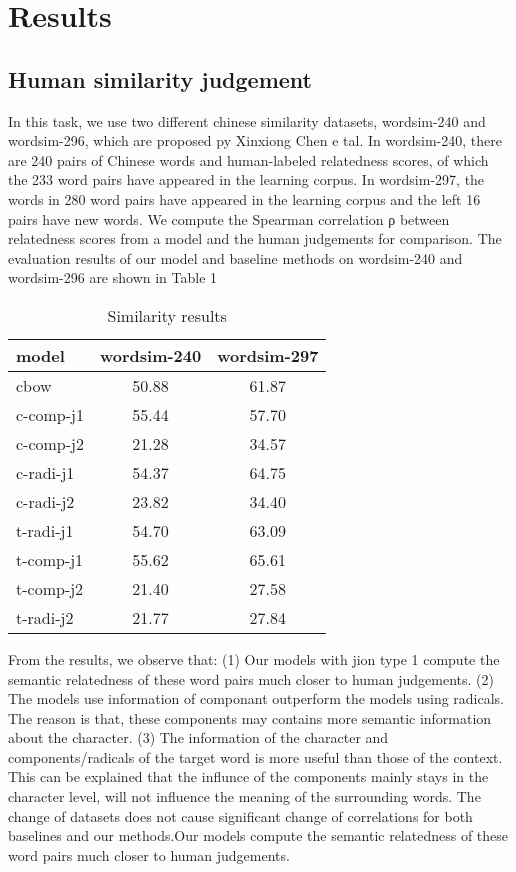 \section{Results}
\subsection{Human similarity judgement} 
In this task, we use two different chinese similarity datasets, wordsim-240 and wordsim-296, which are proposed py Xinxiong Chen e tal. In wordsim-240, there are 240 pairs of Chinese words and human-labeled relatedness scores, of which the 233 word pairs have appeared in the learning corpus. In wordsim-297, the words in 280 word pairs have appeared in the learning corpus and the left 16 pairs have new words.
We compute the Spearman correlation ρ between relatedness scores from a model and the human judgements for comparison. The evaluation results of our model and baseline methods on wordsim-240 and wordsim-296 are shown in Table 1
\begin{table}[h]
\begin{center}
\begin{tabular}{lcc}
\hline \bf model & \bf wordsim-240 & \bf wordsim-297 \\ \hline
cbow & 50.88 & 61.87 \\
c-comp-j1\footnotemark[1] & 55.44 & 57.70\\
c-comp-j2 & 21.28 & 34.57 \\
c-radi-j1 & 54.37 & 64.75 \\
c-radi-j2 & 23.82  & 34.40\\
t-radi-j1  & 54.70 & 63.09\\
t-comp-j1  & 55.62 & 65.61\\
t-comp-j2 & 21.40 & 27.58\\
t-radi-j2 & 21.77 & 27.84\\
\hline
\end{tabular}
\end{center}
\caption{\label{font-table} Similarity results }
\end{table}
From the results, we observe that: (1) Our models with jion type 1 compute the semantic relatedness of these word pairs much closer to human judgements. (2) The models use information of componant outperform the models using radicals. The reason is that, these components may contains more semantic information about the character. (3) The information of the character and components/radicals of the target word is more useful than those of the context. This can be explained that the influnce of the components mainly stays in the character level, will not influence the meaning of the surrounding words. The change of datasets does not cause significant change of correlations for both baselines and our methods.Our models compute the semantic relatedness of these word pairs much closer to human judgements.

